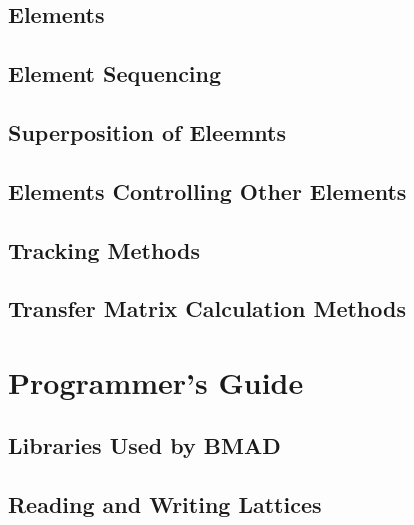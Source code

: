 \documentclass{book}
\begin{document}
\chapter{Elements}

\chapter{Element Sequencing}

\chapter{Superposition of Eleemnts}

\chapter{Elements Controlling Other Elements}

\chapter{Tracking Methods}

\chapter{Transfer Matrix Calculation Methods}

\part{Programmer's Guide}

\chapter{Libraries Used by BMAD}

\chapter{Reading and Writing Lattices}
\end{document}
